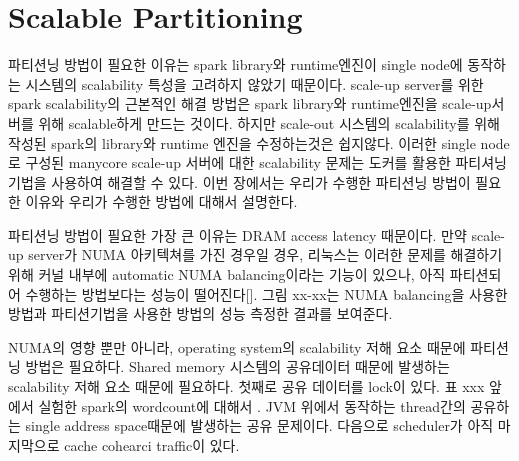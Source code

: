 \section{Scalable Partitioning}
\ifkor
파티션닝 방법이 필요한 이유는 spark library와 runtime엔진이 single node에 동작하는 
시스템의 scalability 특성을 고려하지 않았기 때문이다. 
scale-up server를 위한 spark scalability의 근본적인 해결 방법은 spark library와 
runtime엔진을 scale-up서버를 위해 scalable하게 만드는 것이다.
하지만 scale-out 시스템의 scalability를 위해 작성된 spark의 library와 runtime 엔진을 
수정하는것은 쉽지않다.
이러한 single node로 구성된 manycore scale-up 서버에 대한 scalability
문제는 도커를 활용한 파티셔닝 기법을 사용하여 해결할 수 있다.
이번 장에서는 우리가 수행한 파티션닝 방법이 필요한 이유와 우리가 수행한 방법에 대해서 설명한다.
\else

\fi

\ifkor
파티션닝 방법이 필요한 가장 큰 이유는 DRAM access latency 때문이다. 
만약 scale-up server가 NUMA 아키텍쳐를 가진 경우일 경우, 
리눅스는 이러한 문제를 해결하기 위해 커널 내부에 automatic NUMA balancing이라는 기능이 있으나, 
아직 파티션되어 수행하는 방법보다는 성능이 떨어진다[]. 그림 xx-xx는 NUMA balancing을 
사용한 방법과 파티션기법을 사용한 방법의 성능 측정한 결과를 보여준다. 
\else

\fi

\ifkor
NUMA의 영향 뿐만 아니라, operating system의 scalability 저해 요소 때문에 파티션닝 방법은 필요하다.
Shared memory 시스템의 공유데이터 때문에 발생하는 scalability 저해 요소 때문에 필요하다.
첫째로 공유 데이터를 lock이 있다. 표 xxx 앞에서 실험한 spark의 wordcount에 대해서 .
JVM 위에서 동작하는 thread간의 공유하는 single address space때문에 발생하는 공유 문제이다.
다음으로 scheduler가 아직 
마지막으로 cache cohearci traffic이 있다. 

